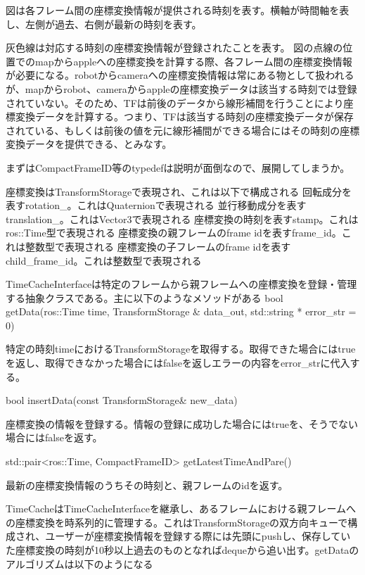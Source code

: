 \documentclass{jarticle}
\begin{document}
\begin{multicols}{2}

図は各フレーム間の座標変換情報が提供される時刻を表す。横軸が時間軸を表し、左側が過去、右側が最新の時刻を表す。

灰色線は対応する時刻の座標変換情報が登録されたことを表す。
図の点線の位置でのmapからappleへの座標変換を計算する際、各フレーム間の座標変換情報が必要になる。robotからcameraへの座標変換情報は常にある物として扱われるが、mapからrobot、cameraからappleの座標変換データは該当する時刻では登録されていない。そのため、TFは前後のデータから線形補間を行うことにより座標変換データを計算する。つまり、TFは該当する時刻の座標変換データが保存されている、もしくは前後の値を元に線形補間ができる場合にはその時刻の座標変換データを提供できる、とみなす。





まずはCompactFrameID等のtypedefは説明が面倒なので、展開してしまうか。


座標変換はTransformStorageで表現され、これは以下で構成される
回転成分を表すrotation\_。これはQuaternionで表現される
並行移動成分を表すtranslation\_。これはVector3で表現される
座標変換の時刻を表すstamp。これはros::Time型で表現される
座標変換の親フレームのframe idを表すframe\_id。これは整数型で表現される
座標変換の子フレームのframe idを表すchild\_frame\_id。これは整数型で表現される

TimeCacheInterfaceは特定のフレームから親フレームへの座標変換を登録・管理する抽象クラスである。主に以下のようなメソッドがある
bool getData(ros::Time time, TransformStorage \& data\_out, std::string * error\_str = 0)

特定の時刻timeにおけるTransformStorageを取得する。取得できた場合にはtrueを返し、取得できなかった場合にはfalseを返しエラーの内容をerror\_strに代入する。

bool insertData(const TransformStorage\& new\_data)

座標変換の情報を登録する。情報の登録に成功した場合にはtrueを、そうでない場合にはfalseを返す。

std::pair<ros::Time, CompactFrameID> getLatestTimeAndPare()

最新の座標変換情報のうちその時刻と、親フレームのidを返す。


TimeCacheはTimeCacheInterfaceを継承し、あるフレームにおける親フレームへの座標変換を時系列的に管理する。これはTransformStorageの双方向キューで構成され、ユーザーが座標変換情報を登録する際には先頭にpushし、保存していた座標変換の時刻が10秒以上過去のものとなればdequeから追い出す。getDataのアルゴリズムは以下のようになる



\end{multicols}
\end{document}
